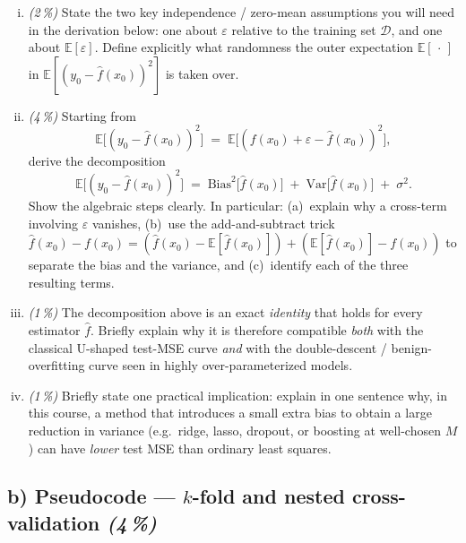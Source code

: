 \documentclass[11pt,a4paper]{article}
\newcommand{\subpoints}[1]{\textit{(#1\,\%)}}
\begin{document}
\begin{enumerate}[(i)]
  \item \subpoints{2} State the two key independence / zero-mean assumptions you will need in the derivation below: one about $\varepsilon$ relative to the training set $\mathcal D$, and one about $\mathbb{E}[\varepsilon]$. Define explicitly what randomness the outer expectation $\mathbb{E}[\,\cdot\,]$ in $\mathbb{E}[(y_0 - \hat f(x_0))^2]$ is taken over.
  \item \subpoints{4} Starting from
  $$\mathbb{E}\bigl[(y_0 - \hat f(x_0))^2\bigr] \;=\; \mathbb{E}\bigl[(f(x_0) + \varepsilon - \hat f(x_0))^2\bigr],$$
  derive the decomposition
  $$\boxed{\;\mathbb{E}\bigl[(y_0 - \hat f(x_0))^2\bigr] \;=\; \mathrm{Bias}^2\!\bigl[\hat f(x_0)\bigr] \;+\; \mathrm{Var}\!\bigl[\hat f(x_0)\bigr] \;+\; \sigma^2.\;}$$
  Show the algebraic steps clearly. In particular: (a)~explain why a cross-term involving $\varepsilon$ vanishes, (b)~use the add-and-subtract trick $\hat f(x_0) - f(x_0) = (\hat f(x_0) - \mathbb{E}[\hat f(x_0)]) + (\mathbb{E}[\hat f(x_0)] - f(x_0))$ to separate the bias and the variance, and (c)~identify each of the three resulting terms.
  \item \subpoints{1} The decomposition above is an exact \emph{identity} that holds for every estimator $\hat f$. Briefly explain why it is therefore compatible \emph{both} with the classical U-shaped test-MSE curve \emph{and} with the double-descent / benign-overfitting curve seen in highly over-parameterized models.
  \item \subpoints{1} Briefly state one practical implication: explain in one sentence why, in this course, a method that introduces a small extra bias to obtain a large reduction in variance (e.g.\ ridge, lasso, dropout, or boosting at well-chosen $M$) can have \emph{lower} test MSE than ordinary least squares.
\end{enumerate}

\subsection*{b) Pseudocode --- $k$-fold and nested cross-validation \subpoints{4}}
\end{document}
